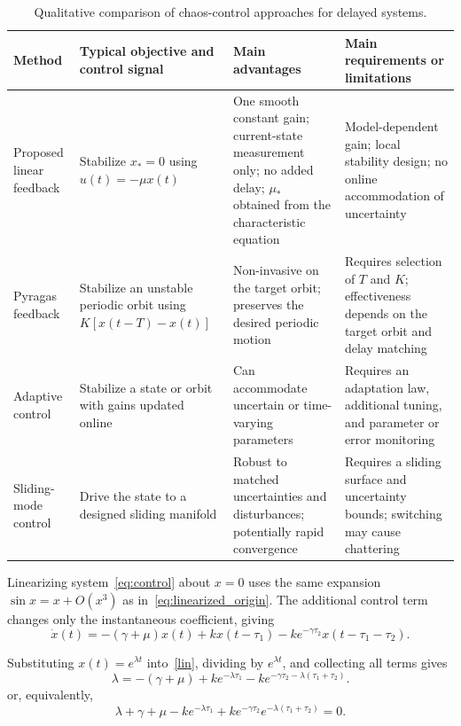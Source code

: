 \documentclass[11pt]{article}
\theoremstyle{remark}
\begin{document}
{
\begin{table}[H]
	\centering
	\small
	\caption{Qualitative comparison of chaos-control approaches for delayed systems.}
	\label{tab:control_comparison}
	\begin{tabular}{p{} p{} p{} p{}}
		\hline
		Method & Typical objective and control signal & Main advantages & Main requirements or limitations \\
		\hline
		Proposed linear feedback & Stabilize $x_*=0$ using $u(t)=-\mu x(t)$ & One smooth constant gain; current-state measurement only; no added delay; $\mu_*$ obtained from the characteristic equation & Model-dependent gain; local stability design; no online accommodation of uncertainty \\
		Pyragas feedback & Stabilize an unstable periodic orbit using $K[x(t-T)-x(t)]$ & Non-invasive on the target orbit; preserves the desired periodic motion & Requires selection of $T$ and $K$; effectiveness depends on the target orbit and delay matching \\
		Adaptive control & Stabilize a state or orbit with gains updated online & Can accommodate uncertain or time-varying parameters & Requires an adaptation law, additional tuning, and parameter or error monitoring \\
		Sliding-mode control & Drive the state to a designed sliding manifold & Robust to matched uncertainties and disturbances; potentially rapid convergence & Requires a sliding surface and uncertainty bounds; switching may cause chattering \\
		\hline
	\end{tabular}
\end{table}

Linearizing system~\eqref{eq:control} about $x=0$ uses the same expansion $\sin x=x+O(x^3)$ as in~\eqref{eq:linearized_origin}. The additional control term changes only the instantaneous coefficient, giving
\begin{equation}
	\dot{x}(t)
	= -(\gamma+\mu)x(t)
	+ kx(t-\tau_1)
	- k e^{-\gamma\tau_2}x(t-\tau_1-\tau_2).
	\label{lin}
\end{equation}

Substituting $x(t)=e^{\lambda t}$ into~\eqref{lin}, dividing by $e^{\lambda t}$, and collecting all terms gives
\begin{equation}
	\lambda
	= -(\gamma+\mu)
	+ k e^{-\lambda\tau_1}
	- k e^{-\gamma\tau_2-\lambda(\tau_1+\tau_2)}.
	\label{char}
\end{equation}
or, equivalently,
\begin{equation}
	\lambda+\gamma+\mu
	-k e^{-\lambda\tau_1}
	+k e^{-\gamma\tau_2}e^{-\lambda(\tau_1+\tau_2)}=0.
	\label{eq:controlled_characteristic_zero}
\end{equation}

}
\end{document}
